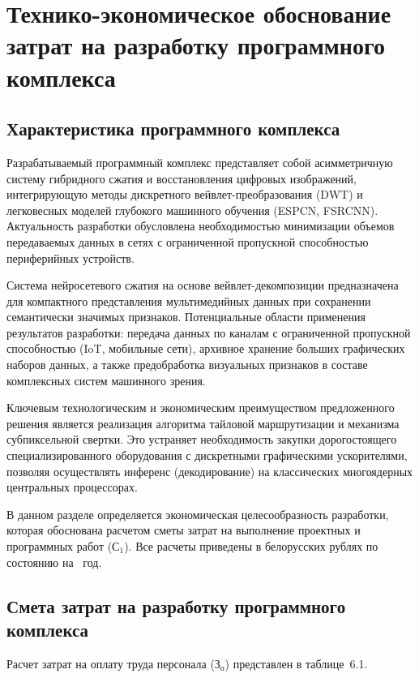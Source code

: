\section{Технико-экономическое обоснование затрат на разработку программного комплекса}

\subsection{Характеристика программного комплекса}

Разрабатываемый программный комплекс представляет собой асимметричную систему гибридного сжатия и восстановления цифровых изображений, интегрирующую методы дискретного вейвлет-преобразования (DWT) и легковесных моделей глубокого машинного обучения (ESPCN, FSRCNN). Актуальность разработки обусловлена необходимостью минимизации объемов передаваемых данных в сетях с ограниченной пропускной способностью периферийных устройств.

Система нейросетевого сжатия на основе вейвлет-декомпозиции предназначена для компактного представления мультимедийных данных при сохранении семантически значимых признаков. Потенциальные области применения результатов разработки: передача данных по каналам с ограниченной пропускной способностью (IoT, мобильные сети), архивное хранение больших графических наборов данных, а также предобработка визуальных признаков в составе комплексных систем машинного зрения.

Ключевым технологическим и экономическим преимуществом предложенного решения является реализация алгоритма тайловой маршрутизации и механизма субпиксельной свертки. Это устраняет необходимость закупки дорогостоящего специализированного оборудования с дискретными графическими ускорителями, позволяя осуществлять инференс (декодирование) на классических многоядерных центральных процессорах.

В данном разделе определяется экономическая целесообразность разработки, которая обоснована расчетом сметы затрат на выполнение проектных и программных работ ($\text{С}_1$). Все расчеты приведены в белорусских рублях по состоянию на \targetYear~год.

\subsection{Смета затрат на разработку программного комплекса}

Расчет затрат на оплату труда персонала ($\text{З}_{\text{о}}$) представлен в таблице~6.1.

